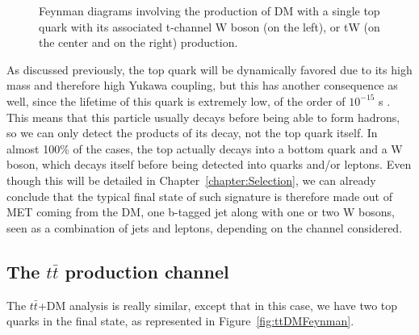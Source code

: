 \documentclass[a4paper, 10pt, openright]{report}
\begin{document}
\begin{figure}[htbp]
\begin{minipage}{.31\textwidth}
{
}
\end{minipage} \hfill
\caption{Feynman diagrams involving the production of \ac{DM} with a single top quark with its associated t-channel W boson (on the left), or tW (on the center and on the right) production.}
\label{fig:singleTopFeynman}
\end{figure}

As discussed previously, the top quark will be dynamically favored due to its high mass and therefore high Yukawa coupling, but this has another consequence as well, since the lifetime of this quark is extremely low, of the order of $10^{-15}$ s \cite{PDG}. This means that this particle usually decays before being able to form hadrons, so we can only detect the products of its decay, not the top quark itself. In almost 100\% of the cases, the top actually decays into a bottom quark and a W boson, which decays itself before being detected into quarks and/or leptons. Even though this will be detailed in Chapter~\ref{chapter:Selection}, we can already conclude that the typical final state of such signature is therefore made out of \ac{MET} coming from the \ac{DM}, one b-tagged jet along with one or two W bosons, seen as a combination of jets and leptons, depending on the channel considered.

\subsection{The $t \bar t$ production channel} \label{subsection:ttChannel}

The $t \bar t$+DM analysis is really similar, except that in this case, we have two top quarks in the final state, as represented in Figure~\ref{fig:ttDMFeynman}.

\end{document}
